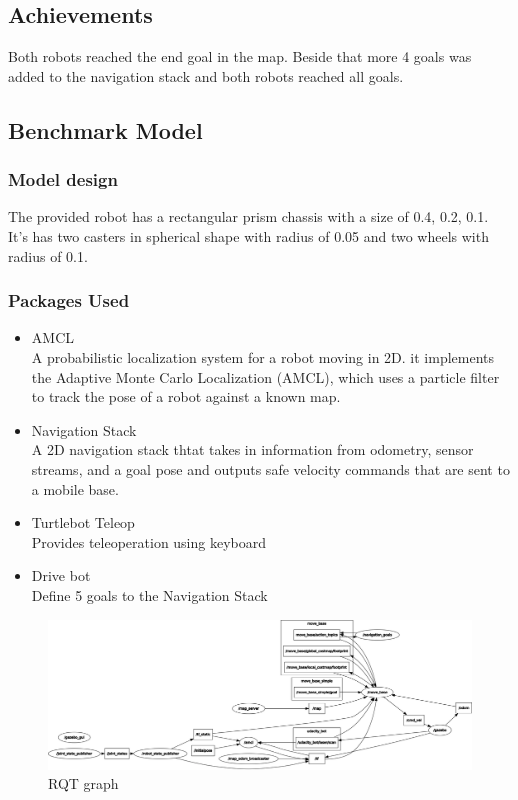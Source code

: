 \documentclass[10pt,journal,compsoc]{IEEEtran}
\begin{document}
\subsection{Achievements}

Both robots reached the end goal in the map. Beside that more 4 goals was added to the navigation stack and both robots
reached all goals.

\subsection{Benchmark Model}
\subsubsection{Model design}

The provided robot has a rectangular prism chassis with a size of 0.4, 0.2, 0.1. It's has two casters in spherical
shape with radius of 0.05 and two wheels with radius of 0.1.

\subsubsection{Packages Used}

\begin{itemize}
  \item AMCL\\
    A probabilistic localization system for a robot moving in 2D. it implements the Adaptive Monte Carlo Localization
    (AMCL), which uses a particle filter to track the pose of a robot against a known map.
  \item Navigation Stack\\
    A 2D navigation stack thtat takes in information from odometry, sensor streams, and a goal pose and outputs safe
    velocity commands that are sent to a mobile base.
  \item Turtlebot Teleop\\
    Provides teleoperation using keyboard
  \item Drive bot\\
    Define 5 goals to the Navigation Stack

\end{itemize}


\begin{figure}[thpb]
      \centering
      \includegraphics[width=\linewidth]{rosgraph.png}
      \caption{RQT graph}
      \label{fig:rqt}
\end{figure}
\end{document}

